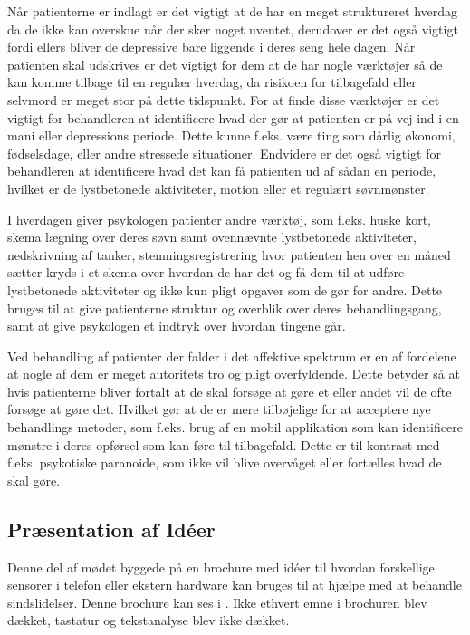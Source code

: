Når patienterne er indlagt er det vigtigt at de har en meget struktureret hverdag da de ikke kan overskue når der sker noget uventet, derudover er det også vigtigt fordi ellers bliver de depressive bare liggende i deres seng hele dagen.
Når patienten skal udskrives er det vigtigt for dem at de har nogle værktøjer så de kan komme tilbage til en regulær hverdag, da risikoen for tilbagefald eller selvmord er meget stor på dette tidspunkt. 
For at finde disse værktøjer er det vigtigt for behandleren at identificere hvad der gør at patienten er på vej ind i en mani eller depressions periode.
Dette kunne f.eks. være ting som dårlig økonomi, fødselsdage, eller andre stressede situationer.
Endvidere er det også vigtigt for behandleren at identificere hvad det kan få patienten ud af sådan en periode, hvilket er de lystbetonede aktiviteter, motion eller et regulært søvnmønster.

I hverdagen giver psykologen patienter andre værktøj, som f.eks. huske kort, skema lægning over deres søvn samt ovennævnte lystbetonede aktiviteter, nedskrivning af tanker, stemningsregistrering hvor patienten hen over en måned sætter kryds i et skema over hvordan de har det og få dem til at udføre lystbetonede aktiviteter og ikke kun pligt opgaver som de gør for andre. 
Dette bruges til at give patienterne struktur og overblik over deres behandlingsgang, samt at give psykologen et indtryk over hvordan tingene går.  

Ved behandling af patienter der falder i det affektive spektrum er en af fordelene at nogle af dem er meget autoritets tro og pligt overfyldende.
Dette betyder så at hvis patienterne bliver fortalt at de skal forsøge at gøre et eller andet vil de ofte forsøge at gøre det.
Hvilket gør at de er mere tilbøjelige for at acceptere nye behandlings metoder, som f.eks. brug af en mobil applikation som kan identificere mønstre i deres opførsel som kan føre til tilbagefald. 
Dette er til kontrast med f.eks. psykotiske paranoide, som ikke vil blive overvåget eller fortælles hvad de skal gøre. 

\subsection{Præsentation af Idéer}
Denne del af mødet byggede på en brochure med idéer til hvordan forskellige sensorer i telefon eller ekstern hardware kan bruges til at hjælpe med at behandle sindslidelser. 
Denne brochure kan ses i .
Ikke ethvert emne i brochuren blev dækket, tastatur og tekstanalyse blev ikke dækket.

